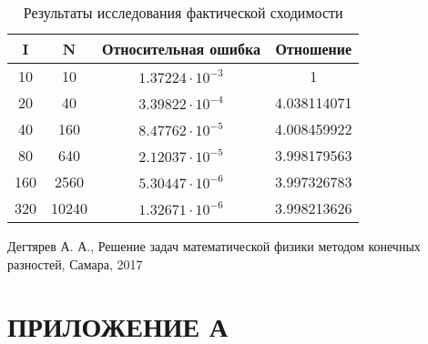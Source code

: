 \documentclass[a4paper,12pt,russian, fleqn]{extreport}
\begin{document}
	\begin{table}[h!]
		\centering
		\caption{Результаты исследования фактической сходимости}
		\begin{tabular}{|c|c|c|c|}
			\hline
			I & N & Относительная ошибка & Отношение \\
			\hline
			10 & 10 & $1.37224\cdot10^{-3}$  & 1 \\
			\hline
			20 & 40 & $3.39822\cdot10^{-4}$ & 4.038114071 \\
			\hline
			40 & 160 & $8.47762\cdot10^{-5}$ & 4.008459922 \\
			\hline
			80 & 640 & $2.12037\cdot10^{-5}$ & 3.998179563 \\
			\hline
			160 & 2560 & $5.30447\cdot10^{-6}$ & 3.997326783 \\
 			\hline
			320 & 10240 & $1.32671\cdot10^{-6}$ & 3.998213626 \\
			\hline
		\end{tabular}
	\end{table}
	\begin{thebibliography}{2}
		 Дегтярев А. А., Решение задач математической физики методом конечных разностей, Самара, 2017
	\end{thebibliography}
	\chapter*{ПРИЛОЖЕНИЕ А}
	\linespread{1} %
	
\end{document}
